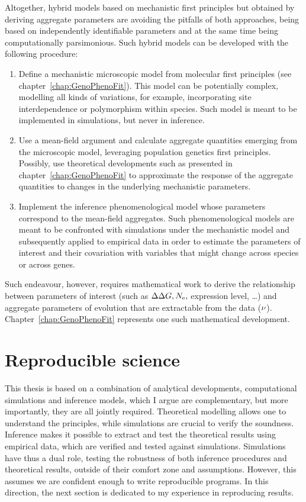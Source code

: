 Altogether, hybrid models based on mechanistic first principles but obtained by deriving aggregate parameters are avoiding the pitfalls of both approaches, being based on independently identifiable parameters and at the same time being computationally parsimonious.
Such hybrid models can be developed with the following procedure:
\begin{enumerate}
    \item Define a mechanistic microscopic model from molecular first principles (see chapter~\ref{chap:GenoPhenoFit}).
    This model can be potentially complex, modelling all kinds of variations, for example, incorporating site interdependence or polymorphism within species.
    Such model is meant to be implemented in simulations, but never in inference.
    \item Use a mean-field argument and calculate aggregate quantities emerging from the microscopic model, leveraging population genetics first principles.
    Possibly, use theoretical developments such as presented in chapter~\ref{chap:GenoPhenoFit} to approximate the response of the aggregate quantities to changes in the underlying mechanistic parameters.
    \item Implement the inference phenomenological model whose parameters correspond to the mean-field aggregates.
    Such phenomenological models are meant to be confronted with simulations under the mechanistic model and subsequently applied to empirical data in order to estimate the parameters of interest and their covariation with variables that might change across species or across genes.
\end{enumerate}
Such endeavour, however, requires mathematical work to derive the relationship between parameters of interest (such as $\Delta \Delta G, N_{\text{e}}, $ expression level, \ldots) and aggregate parameters of evolution that are extractable from the data ($\nu$).
Chapter~\ref{chap:GenoPhenoFit} represents one such mathematical development.

\section{Reproducible science}
\label{sec:reproducible-science}

This thesis is based on a combination of analytical developments, computational simulations and inference models, which I argue are complementary, but more importantly, they are all jointly required.
Theoretical modelling allows one to understand the principles, while simulations are crucial to verify the soundness.
Inference makes it possible to extract and test the theoretical results using empirical data, which are verified and tested against simulations.
Simulations have thus a dual role, testing the robustness of both inference procedures and theoretical results, outside of their comfort zone and assumptions.
However, this assumes we are confident enough to write reproducible programs.
In this direction, the next section is dedicated to my experience in reproducing results.

